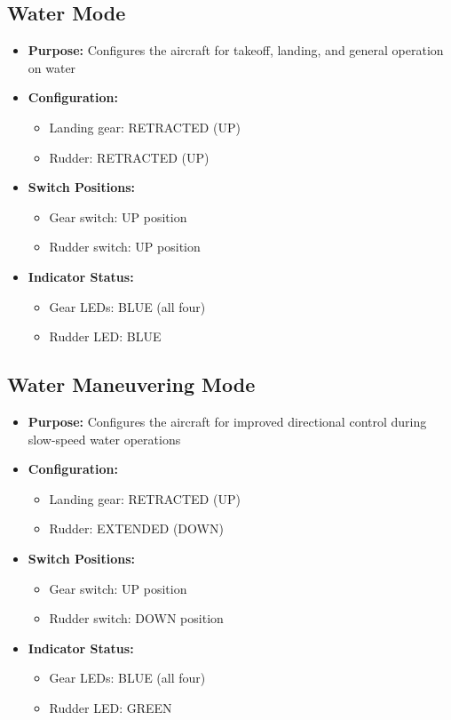 \documentclass[12pt,a4paper,twoside,openright]{book}
\begin{document}
\subsection{Water Mode}
\begin{itemize}
    \item \textbf{Purpose:} Configures the aircraft for takeoff, landing, and general operation on water
    \item \textbf{Configuration:}
    \begin{itemize}
        \item Landing gear: RETRACTED (UP)
        \item Rudder: RETRACTED (UP)
    \end{itemize}
    \item \textbf{Switch Positions:}
    \begin{itemize}
        \item Gear switch: UP position
        \item Rudder switch: UP position
    \end{itemize}
    \item \textbf{Indicator Status:}
    \begin{itemize}
        \item Gear LEDs: BLUE (all four)
        \item Rudder LED: BLUE
    \end{itemize}
\end{itemize}

\subsection{Water Maneuvering Mode}
\begin{itemize}
    \item \textbf{Purpose:} Configures the aircraft for improved directional control during slow-speed water operations
    \item \textbf{Configuration:}
    \begin{itemize}
        \item Landing gear: RETRACTED (UP)
        \item Rudder: EXTENDED (DOWN)
    \end{itemize}
    \item \textbf{Switch Positions:}
    \begin{itemize}
        \item Gear switch: UP position
        \item Rudder switch: DOWN position
    \end{itemize}
    \item \textbf{Indicator Status:}
    \begin{itemize}
        \item Gear LEDs: BLUE (all four)
        \item Rudder LED: GREEN
    \end{itemize}
\end{itemize}
\end{document}
